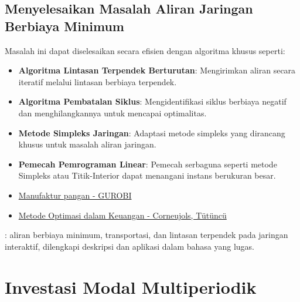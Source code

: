 \subsection*{Menyelesaikan Masalah Aliran Jaringan Berbiaya Minimum}
Masalah ini dapat diselesaikan secara efisien dengan algoritma khusus seperti:
\begin{itemize}
\item \textbf{Algoritma Lintasan Terpendek Berturutan}: Mengirimkan aliran secara iteratif melalui lintasan berbiaya terpendek.
\item \textbf{Algoritma Pembatalan Siklus}: Mengidentifikasi siklus berbiaya negatif dan menghilangkannya untuk mencapai optimalitas.
\item \textbf{Metode Simpleks Jaringan}: Adaptasi metode simpleks yang dirancang khusus untuk masalah aliran jaringan.
\item \textbf{Pemecah Pemrograman Linear}: Pemecah serbaguna seperti metode Simpleks atau Titik-Interior dapat menangani instans berukuran besar.
\end{itemize}

\begin{resource}
\begin{itemize}
\item \href{https://gurobi.github.io/modeling-examples/food_manufacturing_1_2/food_manufacture_1.html}{Manufaktur pangan - GUROBI}
\item \href{https://www.andrew.cmu.edu/user/gc0v/webpub/book.pdf}{Metode Optimasi dalam Keuangan - Corneujols, T\"ut\"unc\"u}
\end{itemize}
\end{resource}

\begin{tryit}
: aliran berbiaya minimum, transportasi, dan lintasan terpendek pada jaringan interaktif, dilengkapi deskripsi dan aplikasi dalam bahasa yang lugas.
\end{tryit}

%
%
\section{Investasi Modal Multiperiodik}
\label{sec:multi-period-capital-investment}

